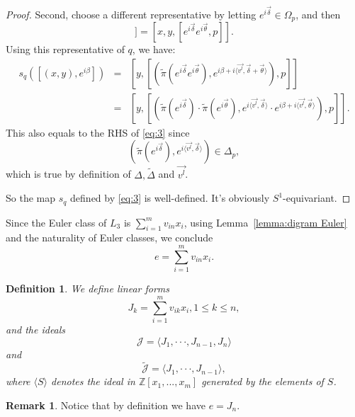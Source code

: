 \documentclass[12pt]{amsart}
\def\Z {{\mathbb{Z}}}
\def\J {{\mathcal{J}}}
\def\cdots {{\cdot\cdot\cdot}}
\newtheorem{definition}[theorem]{Definition}
\theoremstyle{definition}
\newtheorem{remark}[theorem]{Remark}
\numberwithin{equation}{section}
\begin{document}
\begin{proof}
Second, choose a different representative by letting
$e^{i\vec{\delta}}\in \Omega_{p}$, and then
\begin{equation}
[x,y,[e^{i\vec{\theta}},p]]=[x,y,[e^{i\vec{\delta}}e^{i\vec{\theta}},p]].
\end{equation}
Using this representative of $q$, we have:
\begin{eqnarray*}\label{eq:5}
s_{q}([(x,y),e^{i\beta}]) & = &
[y,[(\tilde{\pi}(e^{i\vec{\delta}}e^{i\vec{\theta}}),e^{i\beta+i\langle
\vec{v^{l}},\vec{\delta}+\vec{\theta}\rangle}),p]]\\
& = &
[y,[(\tilde{\pi}(e^{i\vec{\delta}})\cdot\tilde{\pi}(e^{i\vec{\theta}}),e^{i\langle\vec{v^l},\vec{\delta}\rangle}\cdot
e^{i\beta+i\langle\vec{v^l},\vec{\theta}\rangle}),p]].
\end{eqnarray*}
This also equals to the RHS of \eqref{eq:3} since
\begin{equation}\label{eq:6}
(\tilde{\pi}(e^{i\vec{\delta}}),e^{i\langle\vec{v^l},\vec{\delta}\rangle})\in
\Delta_{p},
\end{equation}
which is true by definition of $\Delta, \widetilde{\Delta}$ and
$\vec{v^l}$.

So the map $s_{q}$ defined by \eqref{eq:3} is well-defined. It's
obviously $S^{1}$-equivariant.
\end{proof}

Since the Euler class of $L_{3}$ is $\sum_{i=1}^{m}v_{in}x_{i}$,
using Lemma~\ref{lemma:digram Euler} and  the naturality of Euler
classes, we conclude
\begin{equation}\label{eq:e}
e=\sum_{i=1}^{m}v_{in}x_{i}.
\end{equation}

\begin{definition}
We define linear forms
\begin{equation}
J_{k}=\sum_{i=1}^{m}v_{ik}x_{i}, 1\leq k\leq n,
\end{equation}
and the ideals
\begin{equation}
\J = \langle J_{1},\cdots,J_{n-1},J_{n}\rangle
\end{equation}
and
\begin{equation}
\widetilde{\J}=\langle J_{1},\cdots,J_{n-1}\rangle,
\end{equation}
where $\langle S \rangle$ denotes the ideal in $\Z[x_{1},...,x_{m}]$
generated by the elements of $S$.
\end{definition}
\begin{remark}
Notice that by definition we have $e=J_{n}$.
\end{remark}
\end{document}
